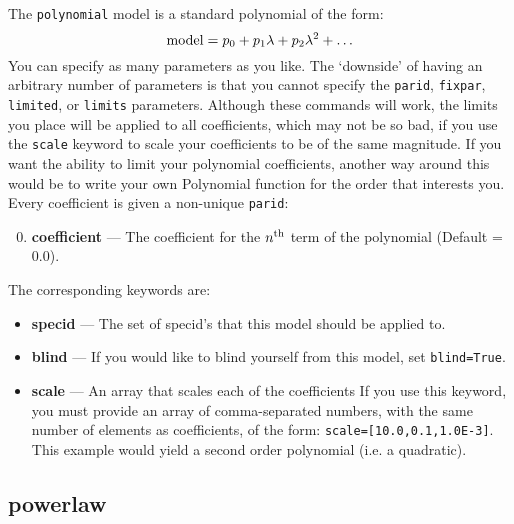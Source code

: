 The \texttt{polynomial} model is a standard polynomial of the form:
\begin{equation}
{\rm model}=p_0 + p_1\lambda + p_2\lambda^2 + \ldots
\end{equation}
You can specify as many parameters as you like. The `downside' of
having an arbitrary number of parameters is that you cannot specify the
\texttt{parid}, \texttt{fixpar}, \texttt{limited}, or \texttt{limits} parameters. Although
these commands will work, the limits you place will be applied to all coefficients,
which may not be so bad, if you use the \texttt{scale} keyword to scale your
coefficients to be of the same magnitude. If you want the ability to limit your
polynomial coefficients, another way around this would be to write your own
Polynomial function for the order that interests you. Every coefficient is given
a non-unique \texttt{parid}:

\begin{enumerate}
\setcounter{enumi}{-1}
\item \textbf{coefficient} --- The coefficient for the $n^{\rm th}$ term of the polynomial (Default = 0.0).
\end{enumerate}

The corresponding keywords are:

\begin{itemize}
\item \textbf{specid} --- The set of specid's that this model should be applied to.
\item \textbf{blind} --- If you would like to blind yourself from this model, set \texttt{blind=True}.
\item \textbf{scale} --- An array that scales each of the coefficients If you use this keyword, you
must provide an array  of comma-separated numbers, with the same number of elements as
coefficients, of the form: \texttt{scale=[10.0,0.1,1.0E-3]}. This example would yield a second
order polynomial (i.e. a quadratic).
\end{itemize}


\subsection{powerlaw}

